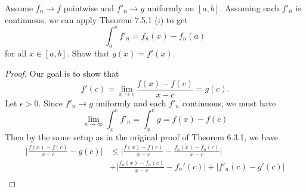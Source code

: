 Assume \( f_{n} \to f  \) pointwise and \( f'_{n} \to g  \) uniformly on \( [a,b]  \). Assuming each \( f'_{n}  \) is continuous, we can apply Theorem 7.5.1 (i) to get 
\[  \int_{ a }^{ x } f'_{n}   = f_{n}(x) - f_{n}(a)  \]
for all \( x \in [a,b]  \). Show that \( g(x) = f'(x) \).


\begin{proof}
Our goal is to show that 
\[  f'(c) = \lim_{ x \to c }  \frac{ f(x) - f(c) }{ x -c  } = g(c). \] Let \( \epsilon > 0  \). Since \( f'_{n} \to g  \) uniformly and each \( f'_{n}  \) continuous, we must have 
\[  \lim_{ n \to \infty  }  \int_{ x }^{ c } f'_{n}   = \int_{ x }^{ c } g = f(x) - f(c)  \]
Then by the same setup as in the original proof of Theorem 6.3.1, we have 
\begin{align*}
	\Big| \frac{ f(x) - f(c) }{ x - c   } - g(c) \Big| &\leq \Big| \frac{ f(x) - f(c)  }{ x -c  } - \frac{ f_{n}(x) - f_{n}(c)  }{ x - c  }  \Big| \\  &+ \Big|  \frac{ f_{n}(x) - f_{n}(c)  }{ x -c  } - f_n'(c)  \Big| + | f'_{n}(c) - g'(c)  |   \\
\end{align*}
\end{proof}





